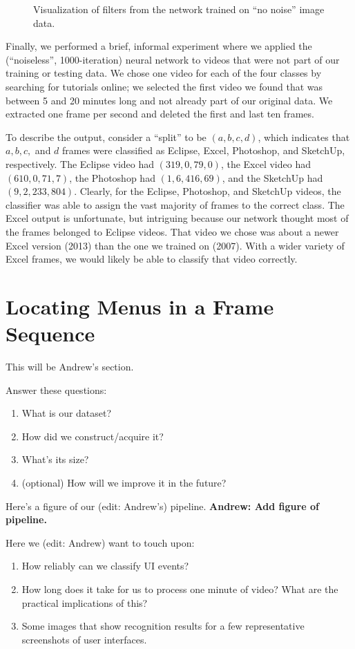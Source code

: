 \documentclass[10pt]{article}
\begin{document}
\begin{figure}[t]
\begin{minipage}{.35\textwidth}
  \caption{Visualization of filters from the network trained on ``no noise'' image data.}
  \label{fig:filters_nonoise}
  \end{minipage}
\end{figure}

Finally, we performed a brief, informal experiment where we applied the (``noiseless'',
1000-iteration) neural network to videos that were not part of our training or testing data. We
chose one video for each of the four classes by searching for tutorials online; we selected the
first video we found that was between 5 and 20 minutes long and not already part of our original
data. We extracted one frame per second and deleted the first and last ten frames.

To describe the output, consider a ``split'' to be $(a,b,c,d)$, which indicates that $a, b, c,$ and
$d$ frames were classified as Eclipse, Excel, Photoshop, and SketchUp, respectively.  The Eclipse
video had $(319,0,79,0)$, the Excel video had $(610,0,71,7)$, the Photoshop had $(1,6,416,69)$, and
the SketchUp had $(9,2,233,804)$. Clearly, for the Eclipse, Photoshop, and SketchUp videos, the
classifier was able to assign the vast majority of frames to the correct class. The Excel output is
unfortunate, but intriguing because our network thought most of the frames belonged to Eclipse
videos. That video we chose was about a newer Excel version (2013) than the one we trained on
(2007).  With a wider variety of Excel frames, we would likely be able to classify that video
correctly.

\section{Locating Menus in a Frame Sequence}\label{andrew}

This will be Andrew's section.

Answer these questions:
\begin{enumerate}[noitemsep]
\item What is our dataset?
\item How did we construct/acquire it?
\item What's its size?
\item (optional) How will we improve it in the future?
\end{enumerate}

Here's a figure of our (edit: Andrew's) pipeline.  \textbf{Andrew: Add figure of pipeline.}

Here we (edit: Andrew) want to touch upon:
\begin{enumerate}[noitemsep]
\item How reliably can we classify UI events?
\item How long does it take for us to process one minute of video?  What are
the practical implications of this?
\item Some images that show recognition results for a few representative
screenshots of user interfaces.
\end{enumerate}
\end{document}
